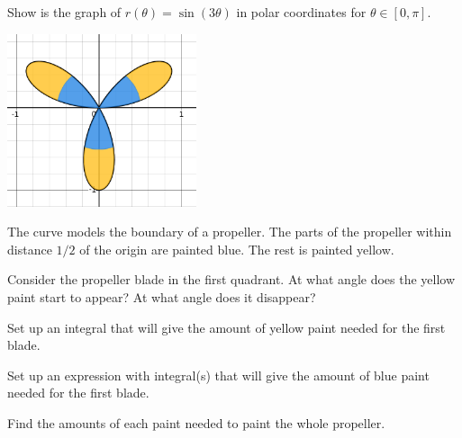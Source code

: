 \documentclass{workbook}
\begin{document}
\begin{slide}
	\question

		Show is the graph of $\displaystyle
		r(\theta)=\sin(3\theta)
		$
		in polar coordinates
		for $\theta\in[0,\pi]$.
		\begin{center}
	\includegraphics[height=2in]{images/propeller-painted.png}
		\end{center}

	
	The curve models the boundary of a propeller. The parts of the propeller
	within distance $1/2$ of the origin are painted blue. The rest is painted yellow.

	\begin{parts}
		\item Consider the propeller blade in the first quadrant. At what
		angle does the yellow paint start to appear? At what angle does it 
		disappear?

		\item Set up an integral that will give the amount of yellow paint needed for the first blade.

		\item Set up an expression with integral(s) that will give the amount of blue paint needed
		for the first blade.

		\item Find the amounts of each paint needed to paint the 
		whole propeller.
	\end{parts}
\end{slide}
\end{document}
